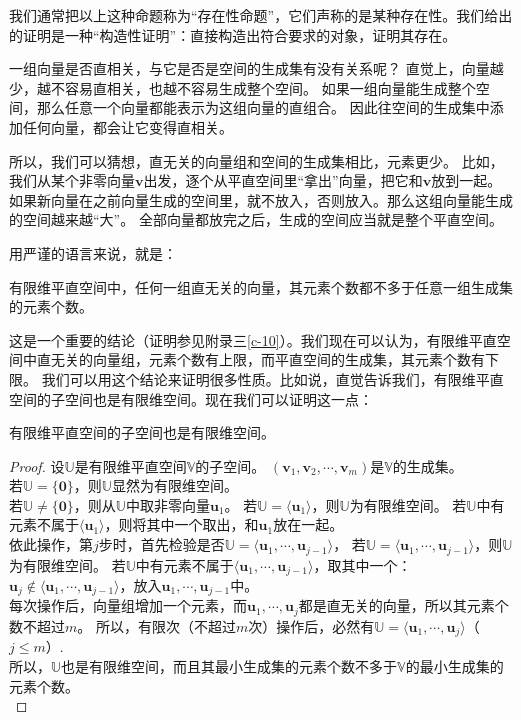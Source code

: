 \documentclass[12pt,UTF8]{ctexbook}
\begin{document}
我们通常把以上这种命题称为“存在性命题”，它们声称的是某种存在性。我们给出的证明是一种“构造性证明”：直接构造出符合要求的对象，证明其存在。

一组向量是否直相关，与它是否是空间的生成集有没有关系呢？
直觉上，向量越少，越不容易直相关，也越不容易生成整个空间。
如果一组向量能生成整个空间，那么任意一个向量都能表示为这组向量的直组合。
因此往空间的生成集中添加任何向量，都会让它变得直相关。

所以，我们可以猜想，直无关的向量组和空间的生成集相比，元素更少。
比如，我们从某个非零向量$\mathbf{v}$出发，逐个从平直空间里“拿出”向量，把它和$\mathbf{v}$放到一起。
如果新向量在之前向量生成的空间里，就不放入，否则放入。那么这组向量能生成的空间越来越“大”。
全部向量都放完之后，生成的空间应当就是整个平直空间。

用严谨的语言来说，就是：
\begin{pp}\label{pp:2_3}
    有限维平直空间中，任何一组直无关的向量，其元素个数都不多于任意一组生成集的元素个数。
\end{pp}
 
这是一个重要的结论（证明参见附录三\ref{c-10}）。我们现在可以认为，有限维平直空间中直无关的向量组，元素个数有上限，而平直空间的生成集，其元素个数有下限。
我们可以用这个结论来证明很多性质。比如说，直觉告诉我们，有限维平直空间的子空间也是有限维空间。现在我们可以证明这一点：

\begin{pp}\label{pp:2_4}
    有限维平直空间的子空间也是有限维空间。
\end{pp}
\begin{proof} %
    设$\mathbb{U}$是有限维平直空间$\mathbb{V}$的子空间。
    $(\mathbf{v}_1, \mathbf{v}_2, \cdots , \mathbf{v}_m )$是$\mathbb{V}$的生成集。\\
    若$\mathbb{U} = \{\mathbf{0}\}$，则$\mathbb{U}$显然为有限维空间。\\
    若$\mathbb{U} \neq \{\mathbf{0}\}$，则从$\mathbb{U}$中取非零向量$\mathbf{u}_1$。
    若$\mathbb{U} = \langle\mathbf{u}_1\rangle$，则$\mathbb{U}$为有限维空间。
    若$\mathbb{U}$中有元素不属于$\langle\mathbf{u}_1\rangle$，则将其中一个取出，和$\mathbf{u}_1$放在一起。\\
    依此操作，第$j$步时，首先检验是否$\mathbb{U} = \langle\mathbf{u}_1, \cdots , \mathbf{u}_{j-1}\rangle$，
    若$\mathbb{U} = \langle\mathbf{u}_1, \cdots , \mathbf{u}_{j-1}\rangle$，则$\mathbb{U}$为有限维空间。
    若$\mathbb{U}$中有元素不属于$\langle\mathbf{u}_1, \cdots , \mathbf{u}_{j-1}\rangle$，取其中一个：
    $\mathbf{u}_j \notin \langle\mathbf{u}_1, \cdots , \mathbf{u}_{j-1}\rangle$，放入$\mathbf{u}_1, \cdots , \mathbf{u}_{j-1}$中。 \\
    每次操作后，向量组增加一个元素，而$\mathbf{u}_1, \cdots , \mathbf{u}_{j}$都是直无关的向量，所以其元素个数不超过$m$。
    所以，有限次（不超过$m$次）操作后，必然有$\mathbb{U} = \langle\mathbf{u}_1,\cdots , \mathbf{u}_{j}\rangle$（$j \leqslant m$）.\\
    所以，$\mathbb{U}$也是有限维空间，而且其最小生成集的元素个数不多于$\mathbb{V}$的最小生成集的元素个数。\\
\end{proof}
\end{document}
